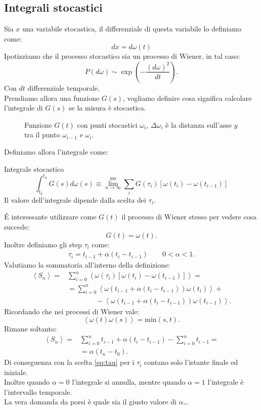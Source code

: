 \subsection{Integrali stocastici}%
\label{sub:Integrali stocastici}
Sia $x$ una variabile stocastica, il differenziale di questa variabile lo definiamo come:
\begin{equation}
    dx = d\omega (t) \label{eq:6_int}
\end{equation}
Ipotizziamo che il processo stocastico sia un processo di Wiener, in tal caso:
\[
    P(d\omega) \sim \exp\left(-\frac{\left(d\omega\right)^2}{dt}\right)
.\] 
Con $dt$ differenziale temporale.\\
Prendiamo allora una funzione $G(s)$, vogliamo definire cosa significa calcolare l'integrale di $G(s)$ se la misura è stocastica.
\begin{figure}[H]
    \centering
    \caption{\scriptsize Funzione $G(t)$ con punti stocastici $\omega_i$, $\Delta\omega_i$ è la distanza sull'asse $y$ tra il punto $\omega_{i-1}$ e $\omega_i$.}
    \label{fig:lez_6_int}
\end{figure}
Definiamo allora l'integrale come:
\begin{redbox}{Integrale stocastico}
\[
    \int_{t_0}^{t_n} G(s) d\omega (s) \equiv \lim^{\text{ms}}_{n \to \infty} \sum_{i}^{} G(\tau_i) \left[\omega (t_i) - \omega (t_{i-1}) \right]
\]     
Il valore dell'integrale dipende dalla scelta dei $\tau_i$.
\end{redbox}
\noindent
\'E interessante utilizzare come $G(t)$ il processo di Wiener stesso per vedere cosa succede:
\[
    G(t) = \omega (t) 
.\]
Inoltre definiamo gli step $\tau_i$ come:
\[\begin{aligned}
    \tau_i = t_{i-1} + \alpha (t_i - t_{i-1}) \qquad 0 <\alpha <1 \label{eq:tau}
.\end{aligned}\]
Valutiamo la sommatoria all'interno della definizione:
\[\begin{aligned}
    \left<S_n\right> =& \sum_{i=0}^{n} \left<\omega (\tau_i)\left[ \omega (t_i) - \omega (t_{i-1})  \right] \right>=\\
		      & = \sum_{i=0}^{n} \left<\omega (t_{i-1} +\alpha (t_i-t_{i-1}) ) \omega(t_i) \right> + \\
		  & \qquad \qquad - \left<\omega (t_{i-1} +\alpha (t_i-t_{i-1}) ) \omega(t_{i-1}) \right>
.\end{aligned}\]
Ricordando che nei processi di Wiener vale:
\[
    \left<\omega (t) \omega (s) \right> = \text{min}(s,t) 
.\] 
Rimane soltanto:
\[\begin{aligned}
    \left<S_n\right> =& \sum_{i=0}^{n} t_{i-1} + \alpha (t_i-t_{i-1}) -\sum_{i=0}^{n} t_{i-1} = \\
		      & =\alpha(t_n-t_0) 
.\end{aligned}\]
Di conseguenza con la scelta \ref{eq:tau} per i $\tau_i$ contano solo l'istante finale ed iniziale. \\
Inoltre quando $\alpha =0$ l'integrale si annulla, mentre quando $\alpha =1$ l'integrale è l'intervallo temporale.\\
La vera domanda da porsi è quale sia il giusto valore di $\alpha$\ldots
